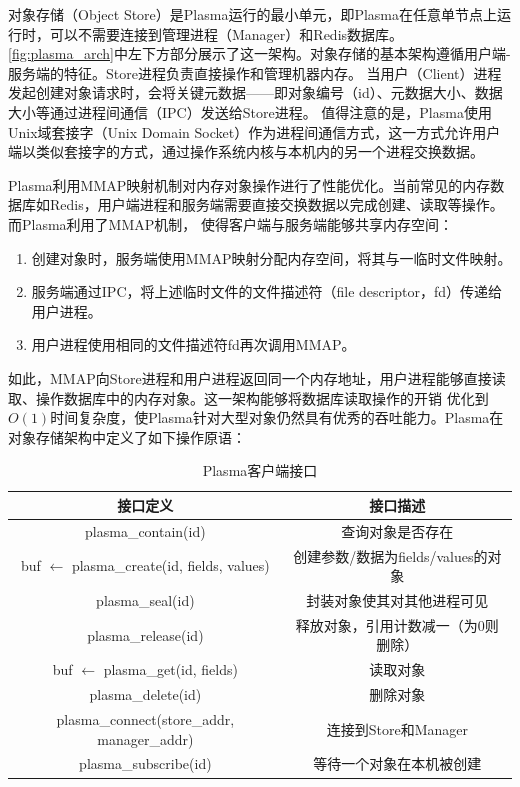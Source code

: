 对象存储（Object Store）是Plasma运行的最小单元，即Plasma在任意单节点上运行时，可以不需要连接到管理进程（Manager）和Redis数据库。
\autoref{fig:plasma_arch}中左下方部分展示了这一架构。对象存储的基本架构遵循用户端-服务端的特征。Store进程负责直接操作和管理机器内存。
当用户（Client）进程发起创建对象请求时，会将关键元数据——即对象编号（id）、元数据大小、数据大小等通过进程间通信（IPC）发送给Store进程。
值得注意的是，Plasma使用Unix域套接字（Unix Domain Socket）作为进程间通信方式，这一方式允许用户端以类似套接字的方式，通过操作系统内核与本机内的另一个进程交换数据。

Plasma利用MMAP映射机制对内存对象操作进行了性能优化。当前常见的内存数据库如Redis，用户端进程和服务端需要直接交换数据以完成创建、读取等操作。而Plasma利用了MMAP机制，
使得客户端与服务端能够共享内存空间：

\begin{enumerate}
    \item 创建对象时，服务端使用MMAP映射分配内存空间，将其与一临时文件映射。
    \item 服务端通过IPC，将上述临时文件的文件描述符（file descriptor，fd）传递给用户进程。
    \item 用户进程使用相同的文件描述符fd再次调用MMAP。
\end{enumerate}

如此，MMAP向Store进程和用户进程返回同一个内存地址，用户进程能够直接读取、操作数据库中的内存对象。这一架构能够将数据库读取操作的开销
优化到$O(1)$时间复杂度，使Plasma针对大型对象仍然具有优秀的吞吐能力。Plasma在对象存储架构中定义了如下操作原语：

\begin{table}[h]
    \centering
    \caption{Plasma客户端接口}
    \begin{tabular}{*{2}{c}}
        \toprule
        接口定义 & 接口描述      \\
        \midrule
        plasma\_contain(id)                                    & 查询对象是否存在   \\
        buf $\leftarrow$ plasma\_create(id, fields, values)    & 创建参数/数据为fields/values的对象   \\
        plasma\_seal(id)                                       & 封装对象使其对其他进程可见   \\
        plasma\_release(id)                                    & 释放对象，引用计数减一（为0则删除）   \\
        buf $\leftarrow$ plasma\_get(id, fields)               & 读取对象   \\
        plasma\_delete(id)                                     & 删除对象   \\
        \midrule
        plasma\_connect(store\_addr, manager\_addr)            & 连接到Store和Manager \\
        plasma\_subscribe(id)                                  & 等待一个对象在本机被创建 \\ 
        \bottomrule
    \end{tabular}
    \label{tab:store_api}
\end{table}

